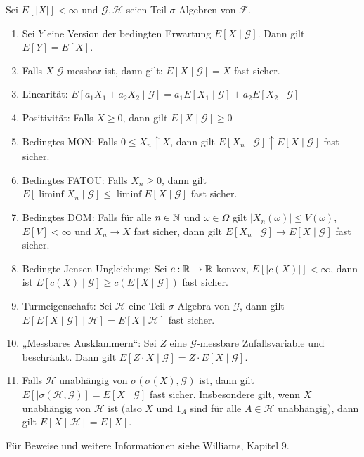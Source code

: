 \documentclass[a4paper,twoside,DIV15,BCOR12mm]{scrbook}
\newcommand{\cF}{\mathcal F}
\begin{document}
\begin{bemerkung}
Sei $E[|X|]<\infty$ und $\mathcal G, \mathcal H$ seien Teil-$\sigma$-Algebren von $\cF$.
\begin{enumerate}
\item Sei $Y$ eine Version der bedingten Erwartung $E[X\mid \mathcal G]$. Dann gilt $E[Y]=E[X]$.
\item Falls $X$ $\mathcal G$-messbar ist, dann gilt: $E[X\mid \mathcal G]=X$ fast sicher.
\item Linearität: $E[a_1 X_1 + a_2 X_2\mid \mathcal G] = a_1 E[X_1\mid \mathcal G] + a_2 E[X_2 \mid \mathcal G]$
\item Positivität: Falls $X\ge 0$, dann gilt $E[X\mid \mathcal G] \ge 0$
\item Bedingtes MON: Falls $0 \le X_n \uparrow X$, dann gilt $E[X_n \mid \mathcal G] \uparrow E[X \mid \mathcal G]$ fast sicher.
\item Bedingtes FATOU: Falls $X_n\ge 0$, dann gilt $E[\liminf X_n \mid\mathcal G] \le \liminf E[X \mid \mathcal G]$ fast sicher.
\item Bedingtes DOM: Falls für alle $n\in\mathbb{N}$ und $\omega\in\Omega$ gilt $|X_n(\omega) |\le V(\omega)$, $E[V]<\infty$ und $X_n\to X$ fast sicher, dann gilt $E[X_n\mid \mathcal G] \to E[X\mid\mathcal G]$ fast sicher.
\item Bedingte Jensen-Ungleichung: Sei $c:\mathbb{R}\to\mathbb{R}$ konvex, $E[|c(X)|]<\infty$, dann ist $E[c(X)\mid\mathcal G] \ge c(E[X\mid \mathcal G])$ fast sicher.
\item Turmeigenschaft: Sei $\mathcal H$ eine Teil-$\sigma$-Algebra von $\mathcal G$, dann gilt $E[E[X\mid\mathcal G]\mid\mathcal H] = E[X\mid\mathcal H]$ fast sicher.
\item „Messbares Ausklammern“: Sei $Z$ eine $\mathcal G$-messbare Zufallsvariable und beschränkt. Dann gilt $E[Z\cdot X\mid \mathcal G] = Z\cdot E[X\mid \mathcal G]$.
\item Falls $\mathcal H$ unabhängig von $\sigma( \sigma(X), \mathcal G)$ ist, dann gilt $E[\mid \sigma(\mathcal H, \mathcal G)] = E[X\mid \mathcal G]$ fast sicher. Insbesondere gilt, wenn $X$ unabhängig von $\mathcal H$ ist (also $X$ und $1_A$ sind für alle $A\in\mathcal H$ unabhängig), dann gilt $E[X\mid \mathcal H] = E[X]$.
\end{enumerate}
\end{bemerkung}

Für Beweise und weitere Informationen siehe Williams, Kapitel 9.
\end{document}
